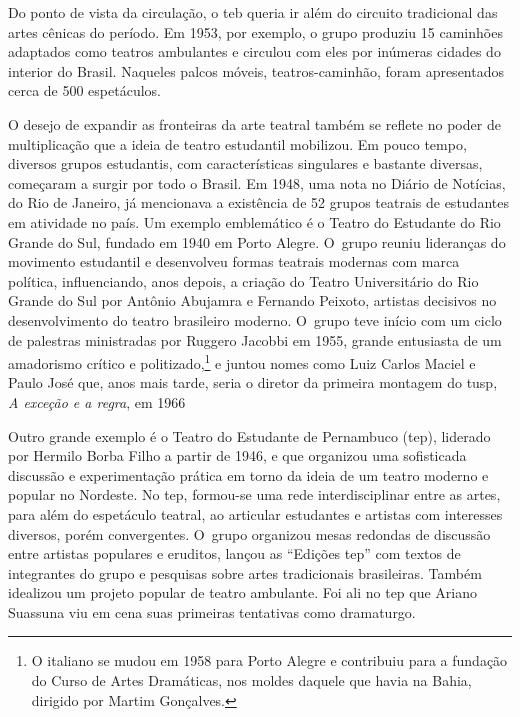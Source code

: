 Do ponto de vista da circulação, o {\sc teb} queria ir além do circuito
tradicional das artes cênicas do período. Em 1953, por exemplo, o grupo
produziu 15 caminhões adaptados como teatros ambulantes e circulou com
eles por inúmeras cidades do interior do Brasil. Naqueles palcos móveis,
teatros-caminhão, foram apresentados cerca de 500 espetáculos.

\subject{Constituição de uma cena estudantil no teatro brasileiro dos anos
1940 e 1950}

O desejo de expandir as fronteiras da arte teatral também se reflete no
poder de multiplicação que a ideia de teatro estudantil mobilizou. Em
pouco tempo, diversos grupos estudantis, com características singulares
e bastante diversas, começaram a surgir por todo o Brasil. Em 1948, uma
nota no Diário de Notícias, do Rio de Janeiro, já mencionava a
existência de 52 grupos teatrais de estudantes em atividade no país. Um
exemplo emblemático é o Teatro do Estudante do Rio Grande do Sul,
fundado em 1940 em Porto Alegre. O~grupo reuniu lideranças do movimento
estudantil e desenvolveu formas teatrais modernas com marca política,
influenciando, anos depois, a criação do Teatro Universitário do Rio
Grande do Sul por Antônio Abujamra e Fernando Peixoto, artistas
decisivos no desenvolvimento do teatro brasileiro moderno. O~grupo teve
início com um ciclo de palestras ministradas por Ruggero Jacobbi em
1955, grande entusiasta de um amadorismo crítico e
politizado,\footnote{O italiano se mudou em 1958 para Porto Alegre e
  contribuiu para a fundação do Curso de Artes Dramáticas, nos moldes
  daquele que havia na Bahia, dirigido por Martim Gonçalves.} e juntou
nomes como Luiz Carlos Maciel e Paulo José que, anos mais tarde, seria o
diretor da primeira montagem do {\sc tusp}, {\it A exceção e a regra}, em 1966

Outro grande exemplo é o Teatro do Estudante de Pernambuco ({\sc tep}),
liderado por Hermilo Borba Filho a partir de 1946, e que organizou uma
sofisticada discussão e experimentação prática em torno da ideia de um
teatro moderno e popular no Nordeste. No {\sc tep}, formou-se uma rede
interdisciplinar entre as artes, para além do espetáculo teatral, ao
articular estudantes e artistas com interesses diversos, porém
convergentes. O~grupo organizou mesas redondas de discussão entre
artistas populares e eruditos, lançou as “Edições {\sc tep}” com textos de
integrantes do grupo e pesquisas sobre artes tradicionais brasileiras.
Também idealizou um projeto popular de teatro ambulante. Foi ali no {\sc tep}
que Ariano Suassuna viu em cena suas primeiras tentativas como
dramaturgo.

